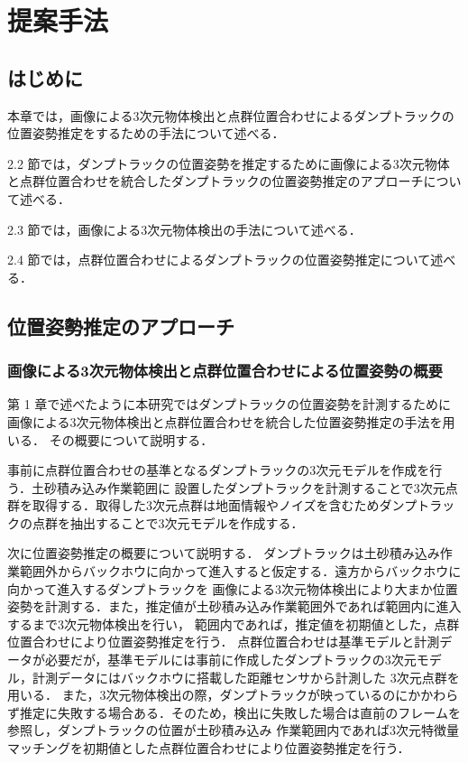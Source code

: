 \chapter{提案手法}
\thispagestyle{empty}
\label{chap2}
\minitoc

\newpage
\section{はじめに}
本章では，画像による3次元物体検出と点群位置合わせによるダンプトラックの位置姿勢推定をするための手法について述べる．
\par
2.2 節では，ダンプトラックの位置姿勢を推定するために画像による3次元物体と点群位置合わせを統合したダンプトラックの位置姿勢推定のアプローチについて述べる．
\par
2.3 節では，画像による3次元物体検出の手法について述べる．
\par
2.4 節では，点群位置合わせによるダンプトラックの位置姿勢推定について述べる．
\newpage

\section{位置姿勢推定のアプローチ}
\subsection{画像による3次元物体検出と点群位置合わせによる位置姿勢の概要}
第 1 章で述べたように本研究ではダンプトラックの位置姿勢を計測するために画像による3次元物体検出と点群位置合わせを統合した位置姿勢推定の手法を用いる．
その概要について説明する．
\par
事前に点群位置合わせの基準となるダンプトラックの3次元モデルを作成を行う．土砂積み込み作業範囲に
設置したダンプトラックを計測することで3次元点群を取得する．取得した3次元点群は地面情報やノイズを含むためダンプトラックの点群を抽出することで3次元モデルを作成する．
\par
次に位置姿勢推定の概要について説明する．
ダンプトラックは土砂積み込み作業範囲外からバックホウに向かって進入すると仮定する．遠方からバックホウに向かって進入するダンプトラックを
画像による3次元物体検出により大まか位置姿勢を計測する．また，推定値が土砂積み込み作業範囲外であれば範囲内に進入するまで3次元物体検出を行い，
範囲内であれば，推定値を初期値とした，点群位置合わせにより位置姿勢推定を行う．
点群位置合わせは基準モデルと計測データが必要だが，基準モデルには事前に作成したダンプトラックの3次元モデル，計測データにはバックホウに搭載した距離センサから計測した
3次元点群を用いる．
また，3次元物体検出の際，ダンプトラックが映っているのにかかわらず推定に失敗する場合ある．そのため，検出に失敗した場合は直前のフレームを参照し，ダンプトラックの位置が土砂積み込み
作業範囲内であれば3次元特徴量マッチングを初期値とした点群位置合わせにより位置姿勢推定を行う．
\newpage
